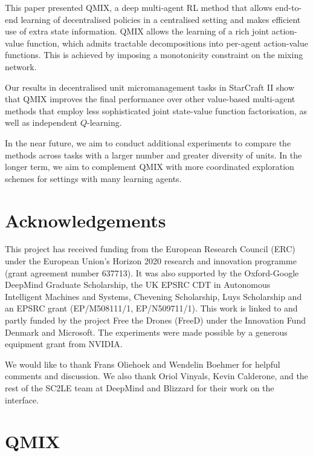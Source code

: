\documentclass{article}
\begin{document}
This paper presented QMIX, a deep multi-agent RL method that allows end-to-end learning of decentralised policies in a centralised setting and makes efficient use of extra state information. QMIX allows the learning of a rich joint action-value function, which admits tractable decompositions into per-agent action-value functions. This is achieved by imposing a monotonicity constraint on the mixing network.

Our results in decentralised unit micromanagement tasks in StarCraft II show that QMIX improves the final performance over other value-based multi-agent methods that employ less sophisticated joint state-value function factorisation, as well as independent $Q$-learning. 

In the near future, we aim to conduct additional experiments to compare the methods across tasks with a larger number and greater diversity of units. In the longer term, we aim to complement QMIX with more coordinated exploration schemes for settings with many learning agents. 
%
 \section*{Acknowledgements} 

This project has received funding from the European Research Council (ERC) under the European Union's Horizon 2020 research and innovation programme (grant agreement number 637713). 
It was also supported by the Oxford-Google DeepMind Graduate Scholarship, the UK EPSRC CDT in Autonomous Intelligent Machines and Systems, Chevening Scholarship, Luys Scholarship and an EPSRC grant (EP/M508111/1, EP/N509711/1). This work is linked to and partly funded by the project Free the Drones (FreeD) under the Innovation Fund Denmark and Microsoft. The experiments were made possible by a generous equipment grant from NVIDIA.

We would like to thank Frans Oliehoek and Wendelin Boehmer for helpful comments and discussion. 
We also thank Oriol Vinyals, Kevin Calderone, and the rest of the SC2LE team at DeepMind and Blizzard for their work on the interface.

 






\onecolumn
\newpage
\appendix
\section{QMIX}
\end{document}
